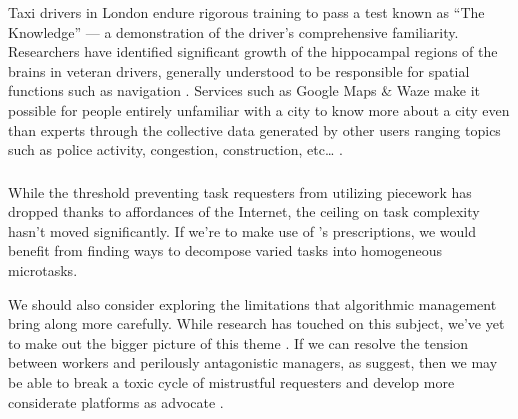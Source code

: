 \documentclass[trackingWork]{subfiles}
\begin{document}
Taxi drivers in London endure rigorous training to pass a test known as ``The Knowledge''
--- a demonstration of the driver's comprehensive familiarity.
Researchers have identified significant growth of
the hippocampal regions of the brains in veteran drivers,
generally understood to be responsible for spatial functions such as navigation
\cite{Maguire11042000,Maguire2894,Skok:1999:KML:299513.299625,
      skok2000managing,Woollett1407,woollett2011acquiring}.
Services such as Google Maps \& Waze make it possible for
people entirely unfamiliar with a city
to know more about a city even than experts through
the collective data generated by other users
ranging topics such as police activity, congestion, construction, etc\dots
\cite{silva2013traffic,hind2014outsmarting}. 

\subsubsection{\implication}
While the threshold preventing task requesters from utilizing piecework
has dropped thanks to affordances of the Internet, the ceiling on task complexity hasn't moved significantly. 
If we're to make use of \citeauthor{Brown01041990}'s prescriptions,
we would benefit from finding ways to decompose varied tasks into homogeneous microtasks. 

We should also consider exploring the limitations that algorithmic management bring along more carefully.
While research has touched on this subject, we've yet to make out the bigger picture of this theme
\cite{uberAlgorithm}.
If we can resolve the tension between workers and perilously antagonistic managers, as \citeauthor{10.2307/2118435} suggest,
then we may be able to break a toxic cycle of mistrustful requesters \cite[for example][]{MaliciousCrowdworkersGadiraju}
and develop more considerate platforms as \citeauthor{takingAHITMcInnis} advocate
\cite{takingAHITMcInnis}.
\end{document}
